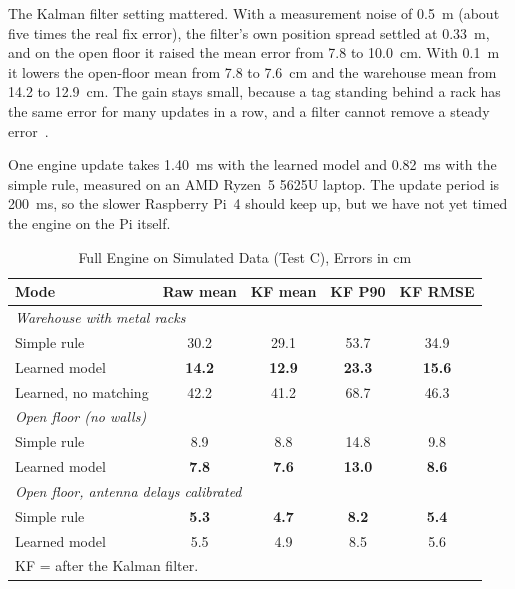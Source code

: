 \documentclass[conference]{IEEEtran}
\begin{document}
The Kalman filter setting mattered. With a measurement noise of 0.5~m (about
five times the real fix error), the filter's own position spread settled at
0.33~m, and on the open floor it raised the mean error from 7.8 to 10.0~cm.
With 0.1~m it lowers the open-floor mean from 7.8 to 7.6~cm and the
warehouse mean from 14.2 to 12.9~cm. The gain stays small, because a tag
standing behind a rack has the same error for many updates in a row, and a
filter cannot remove a steady error~\cite{guvenc2009survey}.

One engine update takes 1.40~ms with the learned model and 0.82~ms with the
simple rule, measured on an AMD Ryzen~5 5625U laptop. The update period is
200~ms, so the slower Raspberry Pi~4 should keep up, but we have not yet
timed the engine on the Pi itself.

\begin{table}[htbp]
\caption{Full Engine on Simulated Data (Test C), Errors in cm}
\label{tab:sim}
\centering
\begin{tabular}{lcccc}
\toprule
\textbf{Mode} & \textbf{Raw mean} & \textbf{KF mean} & \textbf{KF P90} & \textbf{KF RMSE} \\
\midrule
\multicolumn{5}{l}{\textit{Warehouse with metal racks}} \\
Simple rule            & 30.2 & 29.1 & 53.7 & 34.9 \\
Learned model          & \textbf{14.2} & \textbf{12.9} & \textbf{23.3} & \textbf{15.6} \\
Learned, no matching   & 42.2 & 41.2 & 68.7 & 46.3 \\
\midrule
\multicolumn{5}{l}{\textit{Open floor (no walls)}} \\
Simple rule            & 8.9  & 8.8 & 14.8 & 9.8 \\
Learned model          & \textbf{7.8} & \textbf{7.6} & \textbf{13.0} & \textbf{8.6} \\
\midrule
\multicolumn{5}{l}{\textit{Open floor, antenna delays calibrated}} \\
Simple rule            & \textbf{5.3} & \textbf{4.7} & \textbf{8.2} & \textbf{5.4} \\
Learned model          & 5.5 & 4.9 & 8.5 & 5.6 \\
\bottomrule
\multicolumn{5}{l}{\footnotesize KF = after the Kalman filter.}
\end{tabular}
\end{table}
\end{document}
